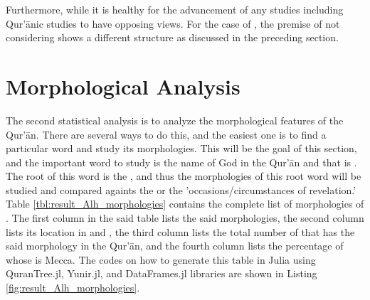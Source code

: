 Furthermore, while it is healthy for the advancement of any studies including Qur'\=anic studies to have opposing views. For the case of , the premise of not considering   shows a different structure as discussed in the preceding section.
\section{Morphological Analysis}\label{sec:result_morphological_analysis}
The second statistical analysis is to analyze the morphological features of the Qur'\=an. There are several ways to do this, and the easiest one is to find a particular word and study its morphologies. This will be the goal of this section, and the important word to study is the name of God in the Qur'\=an and that is  . The root of this word is the  , and thus the morphologies of this root word will be studied and compared againts the   or the 'occasions/circumstances of revelation.' Table \ref{tbl:result_Alh_morphologies} contains the complete list of morphologies of  . The first column in the said table lists the said morphologies, the second column lists its location in   and  , the third column lists the total number of   that has the said morphology in the Qur'\=an, and the fourth column lists the percentage of   whose   is Mecca. The codes on how to generate this table in Julia using QuranTree.jl, Yunir.jl, and DataFrames.jl libraries are shown in Listing \ref{fig:result_Alh_morphologies}.

